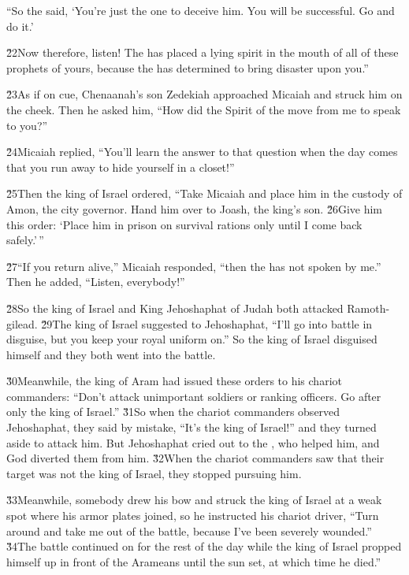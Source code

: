 ``So the  said, `You're just the one to deceive him. You will be successful. Go and do it.'

\v{22}Now therefore, listen! The  has placed a lying spirit in the mouth of all of these prophets of yours, because the  has determined to bring disaster upon you.''

\v{23}As if on cue, Chenaanah's son Zedekiah approached Micaiah and struck him on the cheek. Then he asked him, ``How did the Spirit of the  move from me to speak to you?''

\v{24}Micaiah replied, ``You'll learn the answer to that question when the day comes that you run away to hide yourself in a closet!''

\v{25}Then the king of Israel ordered, ``Take Micaiah and place him in the custody of Amon, the city governor. Hand him over to Joash, the king's son. \v{26}Give him this order: `Place him in prison on survival rations only until I come back safely.'\,''

\v{27}``If you return alive,'' Micaiah responded, ``then the  has not spoken by me.'' Then he added, ``Listen, everybody!''

\v{28}So the king of Israel and King Jehoshaphat of Judah both attacked Ramoth-gilead. \v{29}The king of Israel suggested to Jehoshaphat, ``I'll go into battle in disguise, but you keep your royal uniform on.'' So the king of Israel disguised himself and they both went into the battle.

\v{30}Meanwhile, the king of Aram had issued these orders to his chariot commanders: ``Don't attack unimportant soldiers or ranking officers. Go after only the king of Israel.'' \v{31}So when the chariot commanders observed Jehoshaphat, they said by mistake, ``It's the king of Israel!'' and they turned aside to attack him. But Jehoshaphat cried out to the , who helped him, and God diverted them from him. \v{32}When the chariot commanders saw that their target was not the king of Israel, they stopped pursuing him.

\v{33}Meanwhile, somebody drew his bow and struck the king of Israel at a weak spot where his armor plates joined, so he instructed his chariot driver, ``Turn around and take me out of the battle, because I've been severely wounded.'' \v{34}The battle continued on for the rest of the day while the king of Israel propped himself up in front of the Arameans until the sun set, at which time he died.''


